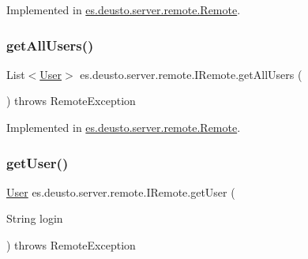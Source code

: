 Implemented in \hyperlink{classes_1_1deusto_1_1server_1_1remote_1_1_remote_a6fb46c2635427f798b75c8ab124b54da}{es.\+deusto.\+server.\+remote.\+Remote}.

\mbox{\label{interfacees_1_1deusto_1_1server_1_1remote_1_1_i_remote_a0ef7c091b38259be1d5ea89a2bda14e1}} 
\subsubsection{\texorpdfstring{get\+All\+Users()}{getAllUsers()}}
{\footnotesize\ttfamily List$<$\hyperlink{classes_1_1deusto_1_1server_1_1db_1_1data_1_1_user}{User}$>$ es.\+deusto.\+server.\+remote.\+I\+Remote.\+get\+All\+Users (\begin{DoxyParamCaption}{ }\end{DoxyParamCaption}) throws Remote\+Exception}



Implemented in \hyperlink{classes_1_1deusto_1_1server_1_1remote_1_1_remote_a5c284c933c6f1f9651634dc764e526d5}{es.\+deusto.\+server.\+remote.\+Remote}.

\mbox{\label{interfacees_1_1deusto_1_1server_1_1remote_1_1_i_remote_a011f0eb1977e978bddb8ef1a385221ed}} 
\subsubsection{\texorpdfstring{get\+User()}{getUser()}}
{\footnotesize\ttfamily \hyperlink{classes_1_1deusto_1_1server_1_1db_1_1data_1_1_user}{User} es.\+deusto.\+server.\+remote.\+I\+Remote.\+get\+User (\begin{DoxyParamCaption}\item[{String}]{login }\end{DoxyParamCaption}) throws Remote\+Exception}



